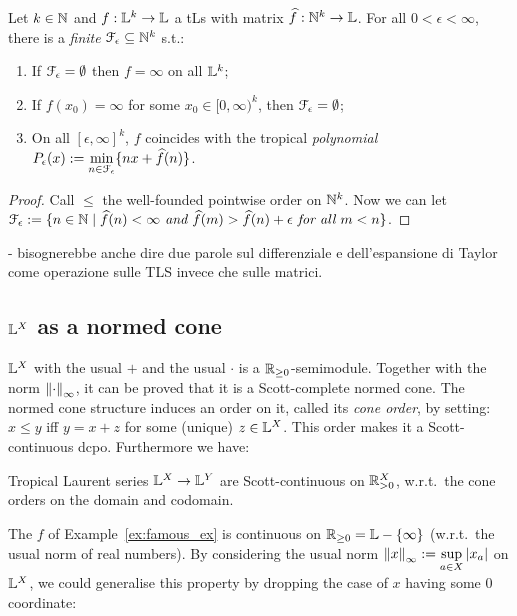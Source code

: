 \begin{theorem}\label{theorem:fepsilon}
 Let $k\in\mathbb{N}$ and $f:\mathbb{L}^k\to\mathbb{L}$ a tLs with matrix $\widehat f:\mathbb{N}^k\to\mathbb{L}$.
 For all $0<\epsilon<\infty$, there is a \emph{finite} $\mathcal{F}_\epsilon \subseteq \mathbb{N}^k$ s.t.:
 \begin{enumerate}
  \item If $\mathcal{F}_\epsilon=\emptyset$ then $f=\infty$ on all $\mathbb{L}^k$;
  \item If $f(x_0)=\infty$ for some $x_0\in[0,\infty)^k$, then $\mathcal{F}_\epsilon=\emptyset$;
  \item On all $[\epsilon,\infty]^k$, $f$ coincides with the tropical \emph{polynomial} $P_\epsilon(x):=\min\limits_{n\in \mathcal{F}_\epsilon}\{nx+\widehat f(n)\}$.
 \end{enumerate}
\end{theorem}
\begin{proof}
 Call $\leq$ the well-founded pointwise order on $\mathbb{N}^k$.
 Now we can let $\mathcal{F}_\epsilon:=\{n\in\mathbb{N} \mid
 \widehat f(n)<\infty \textit{ and } \widehat f(m)> \widehat f(n)+\epsilon \textit{ for all } m<n\}$.
\end{proof}

{\color{red}
- bisognerebbe anche dire due parole sul differenziale e dell'espansione di Taylor come operazione sulle TLS invece che sulle matrici. 
}


\subsection{$\mathbb{L}^{X}$ as a normed cone}

$\mathbb{L}^X$ with the usual $+$ and the usual $\cdot$ is a $\mathbb{R}_{\geq0}$-semimodule.
Together with the norm $\left\lVert\cdot\right\rVert_\infty$, it can be proved that it is a Scott-complete normed cone.
The normed cone structure induces an order on it, called its \emph{cone order}, by setting:
$x\leq y$ iff $y=x+z$ for some (unique) $z\in\mathbb{L}^X$.
This order makes it a Scott-continuous dcpo.
Furthermore we have:

\begin{proposition}
  Tropical Laurent series $\mathbb{L}^X\to\mathbb{L}^Y$ are Scott-continuous on $\mathbb{R}_{>0}^X$, w.r.t.\ the cone orders on the domain and codomain.
\end{proposition}

The $f$ of Example~\ref{ex:famous_ex} is continuous on $\mathbb{R}_{\geq0}=\mathbb{L}-\{\infty\}$ (w.r.t.\ the usual norm of real numbers).
By considering the usual norm $\left\lVert x\right\rVert_\infty:=\sup\limits_{a\in X} \left\lvert x_a\right\rvert$ on $\mathbb{L}^X$, we could generalise this property by dropping the case of $x$ having some $0$ coordinate:

